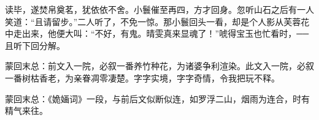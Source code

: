 \begin{parag}
    读毕，遂焚帛奠茗，犹依依不舍。小鬟催至再四，方才回身。忽听山石之后有一人笑道：“且请留步。”二人听了，不免一惊。那小鬟回头一看，却是个人影从芙蓉花中走出来，他便大叫：“不好，有鬼。晴雯真来显魂了！”唬得宝玉也忙看时，──且听下回分解。
\end{parag}


\begin{parag}
    \begin{note}蒙回末总：前文入一院，必叙一番养竹种花，为诸婆争利渲染。此文入一院，必叙一番树枯香老，为亲眷凋零凄楚。字字实境，字字奇情，令我把玩不释。\end{note}
\end{parag}


\begin{parag}
    \begin{note}蒙回末总：《姽婳词》一段，与前后文似断似连，如罗浮二山，烟雨为连合，时有精气来往。\end{note}
\end{parag}
